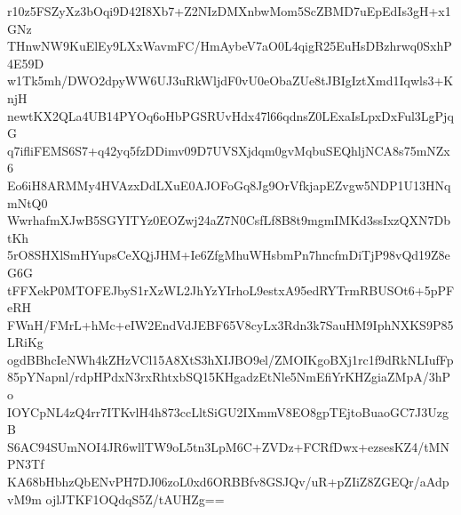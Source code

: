 r10z5FSZyXz3bOqi9D42I8Xb7+Z2NIzDMXnbwMom5ScZBMD7uEpEdIs3gH+x1GNz
THnwNW9KuElEy9LXxWavmFC/HmAybeV7aO0L4qigR25EuHsDBzhrwq0SxhP4E59D
w1Tk5mh/DWO2dpyWW6UJ3uRkWljdF0vU0eObaZUe8tJBIgIztXmd1Iqwls3+KnjH
newtKX2QLa4UB14PYOq6oHbPGSRUvHdx47l66qdnsZ0LExaIsLpxDxFul3LgPjqG
q7ifliFEMS6S7+q42yq5fzDDimv09D7UVSXjdqm0gvMqbuSEQhljNCA8s75mNZx6
Eo6iH8ARMMy4HVAzxDdLXuE0AJOFoGq8Jg9OrVfkjapEZvgw5NDP1U13HNqmNtQ0
WwrhafmXJwB5SGYITYz0EOZwj24aZ7N0CsfLf8B8t9mgmIMKd3ssIxzQXN7DbtKh
5rO8SHXlSmHYupsCeXQjJHM+Ie6ZfgMhuWHsbmPn7hncfmDiTjP98vQd19Z8eG6G
tFFXekP0MTOFEJbyS1rXzWL2JhYzYIrhoL9estxA95edRYTrmRBUSOt6+5pPFeRH
FWnH/FMrL+hMc+eIW2EndVdJEBF65V8cyLx3Rdn3k7SauHM9IphNXKS9P85LRiKg
ogdBBhcIeNWh4kZHzVCl15A8XtS3hXIJBO9el/ZMOIKgoBXj1rc1f9dRkNLIufFp
85pYNapnl/rdpHPdxN3rxRhtxbSQ15KHgadzEtNle5NmEfiYrKHZgiaZMpA/3hPo
IOYCpNL4zQ4rr7ITKvlH4h873ccLltSiGU2IXmmV8EO8gpTEjtoBuaoGC7J3UzgB
S6AC94SUmNOI4JR6wllTW9oL5tn3LpM6C+ZVDz+FCRfDwx+ezsesKZ4/tMNPN3Tf
KA68bHbhzQbENvPH7DJ06zoL0xd6ORBBfv8GSJQv/uR+pZIiZ8ZGEQr/aAdpvM9m
ojlJTKF1OQdqS5Z/tAUHZg==
